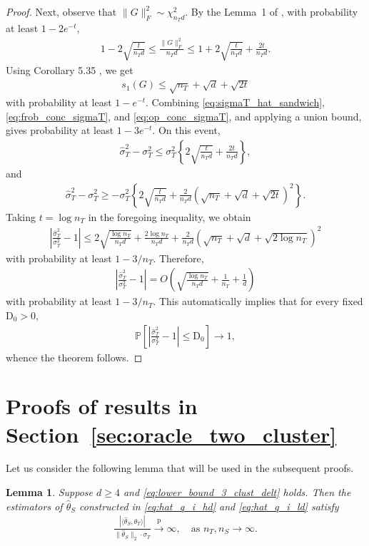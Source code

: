 \documentclass[10pt]{article}
\newtheorem{lemma}{Lemma}
\newcommand{\Pbb}{\mathbb P}
\newcommand{\convp}{\xrightarrow{\mathrm{p}}}
\newcommand{\wh}{\widehat}
\newcommand{\trg}{T}
\newcommand{\thetaT}{\theta_{\trg}}
\newcommand{\nT}{n_{\trg}}
\newcommand{\sigmaT}{\sigma_{\trg}}
\newcommand{\src}{S}
\newcommand{\nS}{n_{\src}}
\begin{document}
\begin{proof}
Next, observe that $\|G\|_F^2\sim \chi^2_{\nT d}.$
By the Lemma~1 of \cite{laurent2000adaptive}, with
probability at least $1-2e^{-t}$,
\begin{align}
    1-2\sqrt{\frac{t}{\nT d}}
    \le
    \frac{\|G\|_F^2}{\nT d}
    \le
    1+2\sqrt{\frac{t}{\nT d}}
    +
    \frac{2t}{\nT d}.
    \label{eq:frob_conc_sigmaT}
\end{align}
Using Corollary 5.35 \cite{vershynin2012introduction}, we get
\begin{align}
    s_1(G)
    \le
    \sqrt{\nT}+\sqrt d+\sqrt{2t}
    \label{eq:op_conc_sigmaT}
\end{align}
with probability at least $1-e^{-t}$. Combining
\eqref{eq:sigmaT_hat_sandwich}, \eqref{eq:frob_conc_sigmaT}, and
\eqref{eq:op_conc_sigmaT}, and applying a union bound, gives probability
at least $1-3e^{-t}$. On this event,
\begin{align}
    \wh\sigma^2_T-\sigmaT^2
    \le
    \sigmaT^2\left\{
        2\sqrt{\frac{t}{\nT d}}
        +
        \frac{2t}{\nT d}
    \right\},
\end{align}
and
\begin{align}
    \wh\sigma^2_T-\sigmaT^2
    \ge
    -\sigmaT^2\left\{
        2\sqrt{\frac{t}{\nT d}}
        +
        \frac{2}{\nT d}
        \left(\sqrt{\nT}+\sqrt d+\sqrt{2t}\right)^2
    \right\}.
\end{align}
Taking $t=\log \nT$ in the foregoing inequality, we obtain
\begin{align}
\left|\frac{\wh\sigma^2_T}{\sigmaT^2}-1\right|
\le 2\sqrt{\frac{\log \nT}{\nT d}}+\frac{2\log \nT}{\nT d}+\frac{2}{\nT d}\left(\sqrt{\nT}+\sqrt d+\sqrt{2\log \nT}\right)^2
\end{align}
with probability at least $1-3/\nT$. 
Therefore,
\begin{align}
\left|\frac{\wh\sigma^2_T}{\sigmaT^2}-1\right|=
O\left(\sqrt{\frac{\log \nT}{\nT d}}+\frac{1}{\nT}+\frac{1}{d}\right)
\end{align}
with probability at least $1-3/\nT$. This automatically implies that for every
fixed $\mathrm D_0>0$,
\begin{align}
\Pbb\left[\left|\frac{\wh\sigma^2_T}{\sigmaT^2}-1\right|\le \mathrm D_0\right]\to 1,
\end{align}
whence the theorem follows.
\end{proof}


\section{Proofs of results in Section~\ref{sec:oracle_two_cluster}}
Let us consider the following lemma that will be used in the subsequent proofs.
\begin{lemma}
\label{lem:projected_diverge_source}
Suppose $d \ge 4$ and \eqref{eq:lower_bound_3_clust_delt} holds. Then the estimators of $\wh{\theta}_{\src}$ constructed in \eqref{eq:hat_q_i_hd} and \eqref{eq:hat_q_i_ld} satisfy
\begin{align}
    \frac{|\langle\wh \theta_{\src},\thetaT\rangle|}{\|\wh \theta_\src\|_2\cdot\sigmaT} \convp \infty, \quad \mbox{as $\nT,\nS \to \infty$}.
\end{align}
\end{lemma}
\end{document}
